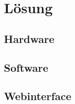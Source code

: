 \chapter{Lösung}

\section{Hardware}



\newpage
\section{Software}




\newpage
\section{Webinterface}




